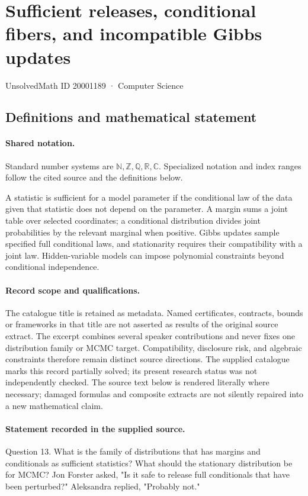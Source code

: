 \documentclass[11pt]{article}
\begin{document}
\setcounter{section}{20001188}
\section{Sufficient releases, conditional fibers, and incompatible Gibbs updates}\label{20001189}
{\small\sffamily UnsolvedMath ID 20001189 · Computer Science}
\subsection{Definitions and mathematical statement}

\paragraph{Shared notation.}Standard number systems are $\mathbb N,\mathbb Z,\mathbb Q,\mathbb R,\mathbb C$. Specialized notation and index ranges follow the cited source and the definitions below.


A statistic is sufficient for a model parameter if the conditional law of the data given that statistic does not depend on the parameter. A margin sums a joint table over selected coordinates; a conditional distribution divides joint probabilities by the relevant marginal when positive. Gibbs updates sample specified full conditional laws, and stationarity requires their compatibility with a joint law. Hidden-variable models can impose polynomial constraints beyond conditional independence.
\paragraph{Record scope and qualifications.}
The catalogue title is retained as metadata. Named certificates, contracts, bounds or frameworks in that title are not asserted as results of the original source extract.
The excerpt combines several speaker contributions and never fixes one distribution family or MCMC target. Compatibility, disclosure risk, and algebraic constraints therefore remain distinct source directions. The supplied catalogue marks this record partially solved; its present research status was not independently checked.
The source text below is rendered literally where necessary; damaged formulas and composite extracts are not silently repaired into a new mathematical claim.
\paragraph{Statement recorded in the supplied source.}
Question 13. What is the family of distributions that has margins and conditionals as sufficient statistics? What should the stationary distribution be for MCMC? Jon Forster asked, "Is it safe to release full conditionals that have been perturbed?" Aleksandra replied, "Probably not."
\end{document}
